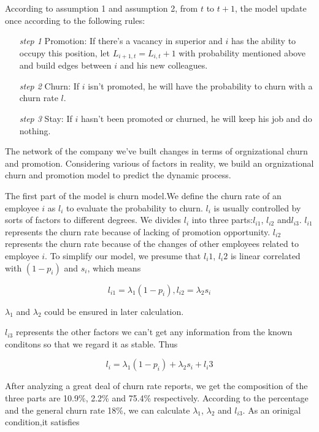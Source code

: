 \documentclass[12pt,a4paper,titlepage]{article}
\begin{document}
According to assumption 1 and assumption 2, from $t$ to $t+1$, the
model update once according to the following rules:

\begin{itemize}
\item [\textit{step 1}] Promotion: If there's a vacancy in superior
  and $i$ has the ability to occupy this position, let $L_{i+1,t} =
  L_{i,t}+1$ with probability mentioned above and build edges between
  $i$ and his new colleagues.
\item [\textit{step 2}] Churn: If $i$ isn't promoted, he will have the
  probability to churn with a churn rate $l$.
\item [\textit{step 3}] Stay: If $i$ hasn't been promoted or churned,
  he will keep his job and do nothing.
\end{itemize}

The network of the company we've built changes in terms of
orgnizational churn and promotion. Considering various of factors in
reality, we build an orgnizational churn and promotion model to
predict the dynamic process.

The first part of the model is churn model.We define the churn rate of
an employee $i$ as $l_i$ to evaluate the probability to churn. $l_i$ is
usually controlled by sorts of factors to different degrees. We
divides $l_i$ into three parts:$l_{i1}$, $l_{i2}$ and$l_{i3}$.  $l_{i1}$
represents the churn rate because of lacking of promotion
opportunity. $l_{i2}$ represents the churn rate because of the changes
of other employees related to employee $i$. To simplify our model, we
presume that $l_i1$, $l_i2$ is linear correlated with $(1-p_i)$ and
$s_i$, which means

\begin{equation}
  l_{i1}=\lambda_1(1-p_i),l_{i2}=\lambda_2s_i
\end{equation}

$\lambda_1$ and $\lambda_2$ could be ensured in later calculation.

$l_{i3}$ represents the other factors we can't get any information from
the known conditons so that we regard it as stable.  Thus

\begin{equation}
  l_i = \lambda_1(1-p_i) + \lambda_2s_i +l_i3
\end{equation}

After analyzing a great deal of churn rate reports, we get the
composition of the three parts are 10.9\%, 2.2\% and 75.4\%
respectively. According to the percentage and the general
churn rate 18\%, we can calculate $\lambda_1$, $\lambda_2$ and
$l_{i3}$. As an orinigal condition,it satisfies
\end{document}

